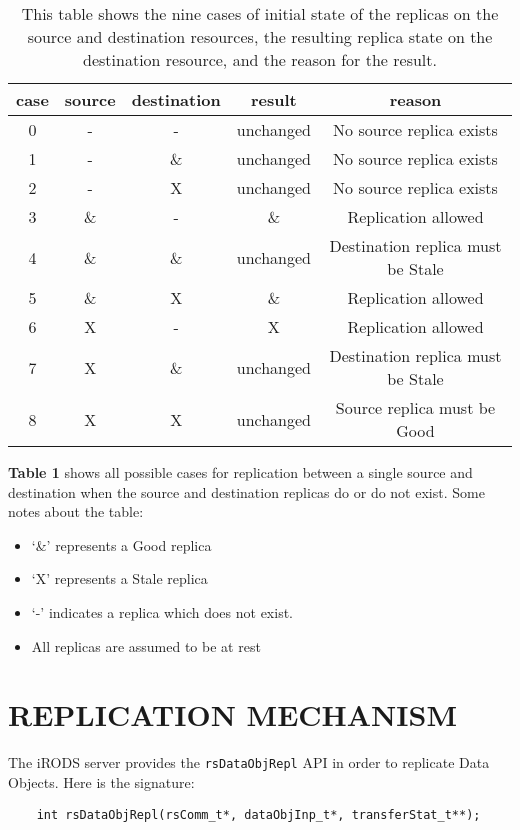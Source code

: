 \documentclass{irodsugm}
\begin{document}
\begin{table}[]
    \centering
    \begin{tabular}{c | c | c | c | c}
        case & source & destination & result & reason \\
        \hline
        0 & - & - & unchanged & No source replica exists \\
        1 & - & \& & unchanged & No source replica exists \\
        2 & - & X & unchanged & No source replica exists \\
        3 & \& & - & \& & Replication allowed \\
        4 & \& & \& & unchanged & Destination replica must be Stale \\
        5 & \& & X & \& & Replication allowed \\
        6 & X & - & X & Replication allowed \\
        7 & X & \& & unchanged & Destination replica must be Stale \\
        8 & X & X & unchanged & Source replica must be Good
    \end{tabular}
    \caption{This table shows the nine cases of initial state of the replicas on the source and destination resources, the resulting replica state on the destination resource, and the reason for the result.}
    \label{tab:replication_behavior_table}
\end{table}

\textbf{Table 1} shows all possible cases for replication between a single source and destination when the source and destination replicas do or do not exist. Some notes about the table:
\begin{itemize}
    \item ‘\&’ represents a Good replica
    \item ‘X’ represents a Stale replica
    \item ‘-’ indicates a replica which does not exist.
    \item All replicas are assumed to be at rest
\end{itemize}

\section*{REPLICATION MECHANISM}

The iRODS server provides the \texttt{rsDataObjRepl} API in order to replicate Data Objects. Here is the signature:

\begin{samepage}
\begin{verbatim}
    int rsDataObjRepl(rsComm_t*, dataObjInp_t*, transferStat_t**);
\end{verbatim}
\end{samepage}
\end{document}
